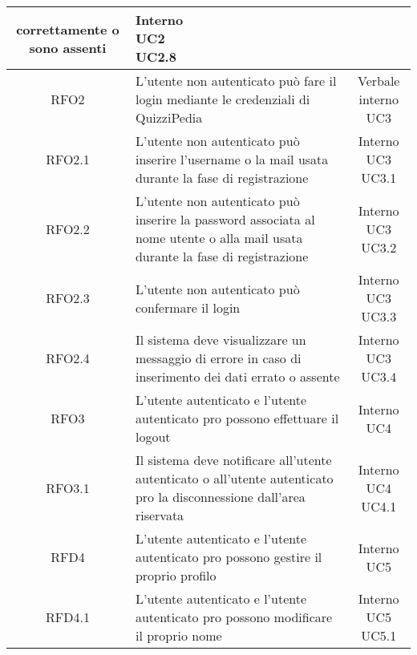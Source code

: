 \begin{longtable}{|c|>{\centering}m{7cm}|c|}
correttamente o sono assenti & \makecell{Interno\\ UC2 \\UC2.8 } \\ \hline
			 \hypertarget{{RFO2}}{{RFO2}} & L’utente non autenticato può fare il login
mediante le credenziali di QuizziPedia & \makecell{Verbale interno\\ UC3 } \\ \hline
			 \hypertarget{{RFO2.1}}{{RFO2.1}} & L’utente non autenticato può inserire l'username o la mail usata durante la
fase di registrazione & \makecell{Interno\\ UC3 \\UC3.1 } \\ \hline
			 \hypertarget{{RFO2.2}}{{RFO2.2}} & L’utente non autenticato può inserire la
password associata al nome utente o alla
mail usata durante la fase di registrazione & \makecell{Interno\\ UC3 \\UC3.2 } \\ \hline
			 \hypertarget{{RFO2.3}}{{RFO2.3}} & L’utente non autenticato può confermare
il login & \makecell{Interno\\ UC3 \\UC3.3 } \\ \hline
			 \hypertarget{{RFO2.4}}{{RFO2.4}} & Il sistema deve visualizzare un messaggio
di errore in caso di inserimento dei dati
errato o assente & \makecell{Interno\\ UC3 \\UC3.4 } \\ \hline
			 \hypertarget{{RFO3}}{{RFO3}} & L’utente autenticato e l’utente
autenticato pro possono effettuare il
logout & \makecell{Interno\\ UC4 } \\ \hline
			 \hypertarget{{RFO3.1}}{{RFO3.1}} & Il sistema deve notificare all’utente
autenticato o all’utente autenticato pro la
disconnessione dall’area riservata & \makecell{Interno\\ UC4 \\UC4.1 } \\ \hline
			 \hypertarget{{RFD4}}{{RFD4}} & L’utente autenticato e l’utente
autenticato pro possono gestire il proprio
profilo & \makecell{Interno\\ UC5 } \\ \hline
			 \hypertarget{{RFD4.1}}{{RFD4.1}} & L’utente autenticato e l’utente
autenticato pro possono modificare il
proprio nome & \makecell{Interno\\ UC5 \\UC5.1 } \\ \hline

\end{longtable}
